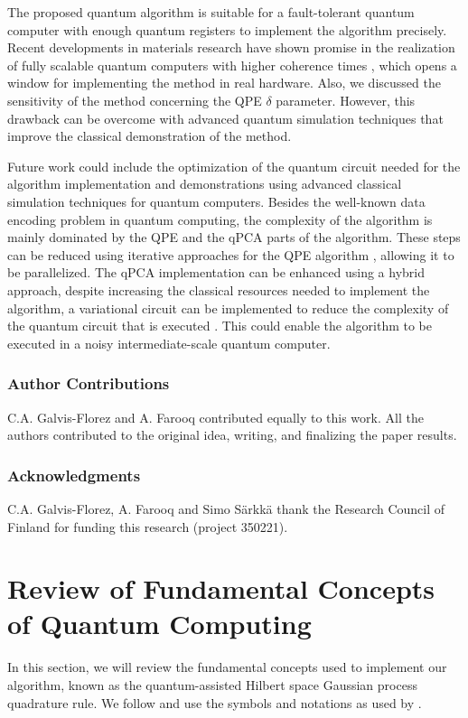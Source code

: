 \documentclass[10pt]{article}
\begin{document}
	The proposed quantum algorithm is suitable for a fault-tolerant quantum computer with enough quantum registers to implement the algorithm precisely.  Recent developments in materials research have shown promise in the realization of fully scalable quantum computers with higher coherence times \citep{Acharya2024EnrichedSi}, which opens a window for implementing the method in real hardware. Also, we discussed the sensitivity of the method concerning the QPE $\delta$ parameter. However, this drawback can be overcome with advanced quantum simulation techniques \citep{Zulehner2019AdvancedQS} that improve the classical demonstration of the method.
	
	Future work could include the optimization of the quantum circuit needed for the algorithm implementation and demonstrations using advanced classical simulation techniques for quantum computers.
	Besides the well-known data encoding problem in quantum computing, the complexity of the algorithm is mainly dominated by the QPE and the qPCA parts of the algorithm. 
	These steps can be reduced using iterative approaches for the QPE algorithm \citep{Smith2022IterativeQPE}, allowing it to be parallelized. 
	The qPCA implementation can be enhanced using a hybrid approach, despite increasing the classical resources needed to implement the algorithm, a variational circuit can be implemented to reduce the complexity of the quantum circuit that is executed \citep{Xin2021EsperimentalQPCA}. This could enable the algorithm to be executed in a noisy intermediate-scale quantum computer.
	
	\subsubsection*{Author Contributions}
	C.A. Galvis-Florez and A. Farooq contributed equally to this work. All the authors contributed to the original idea, writing, and finalizing the paper results.
	
	\subsubsection*{Acknowledgments}
	C.A. Galvis-Florez, A. Farooq and Simo Särkkä thank the Research Council of Finland for funding this research (project 350221). 
	
	
	
	\appendix
	\section{\label{app: basics}Review of Fundamental Concepts of Quantum Computing}
	In this section, we will review the fundamental concepts used to implement our algorithm, known as the quantum-assisted Hilbert space Gaussian process quadrature rule. We follow and use the symbols and notations as used by \citet{Schuld2021QML}.
\end{document}

